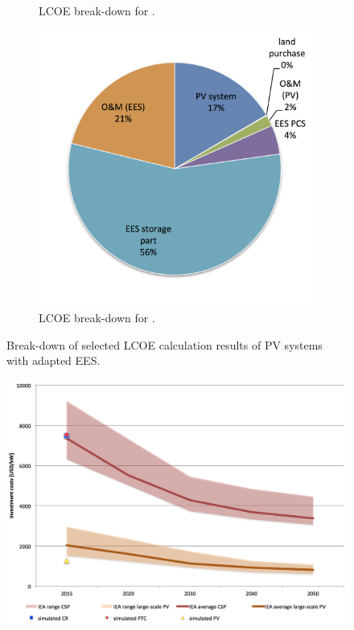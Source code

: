 \begin{figure}[!htbp]
\begin{subfigure}[b]{0.5\textwidth}
                \caption{LCOE break-down for .}\label{PTC_LCOE_90_BreakDown}
        \end{subfigure}
\par\medskip %
        \begin{subfigure}[b]{0.5\textwidth}
                \centering
                \includegraphics[width=1\textwidth]{FIG/PV_LCOE_90_BreakDown}
                \caption{LCOE break-down for .}\label{PV_LCOE_90_BreakDown}
        \end{subfigure}
        \caption[Break-down of selected LCOE calculation results of PV systems with adapted EES.]{Break-down of selected LCOE calculation results of PV systems with adapted EES.}\label{SMPV_LCOE_BreakDown}
\end{figure}

\begin{figure}[htbp]  
\centering
\includegraphics[width=0.95\linewidth]{FIG/investmentcost}
\caption[]{}\label{investmentcost}
\end{figure}

